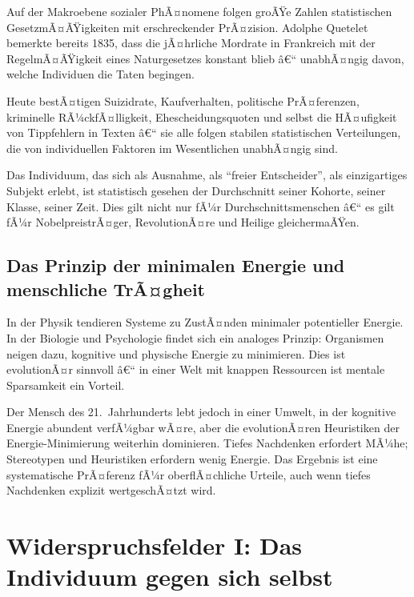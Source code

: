 ﻿\documentclass[12pt, a4paper]{article}
\begin{document}
Auf der Makroebene sozialer PhÃ¤nomene folgen groÃŸe Zahlen statistischen
GesetzmÃ¤ÃŸigkeiten mit erschreckender PrÃ¤zision. Adolphe Quetelet bemerkte bereits
1835, dass die jÃ¤hrliche Mordrate in Frankreich mit der RegelmÃ¤ÃŸigkeit eines
Naturgesetzes konstant blieb â€“ unabhÃ¤ngig davon, welche Individuen die Taten
begingen.

Heute bestÃ¤tigen Suizidrate, Kaufverhalten, politische PrÃ¤ferenzen, kriminelle
RÃ¼ckfÃ¤lligkeit, Ehescheidungsquoten und selbst die HÃ¤ufigkeit von Tippfehlern
in Texten â€“ sie alle folgen stabilen statistischen Verteilungen, die von
individuellen Faktoren im Wesentlichen unabhÃ¤ngig sind.

Das Individuum, das sich als Ausnahme, als \enquote{freier Entscheider}, als
einzigartiges Subjekt erlebt, ist statistisch gesehen der Durchschnitt seiner
Kohorte, seiner Klasse, seiner Zeit. Dies gilt nicht nur fÃ¼r Durchschnittsmenschen â€“
es gilt fÃ¼r NobelpreistrÃ¤ger, RevolutionÃ¤re und Heilige gleichermaÃŸen.

\subsection{Das Prinzip der minimalen Energie und menschliche TrÃ¤gheit}

In der Physik tendieren Systeme zu ZustÃ¤nden minimaler potentieller Energie.
In der Biologie und Psychologie findet sich ein analoges Prinzip: Organismen
neigen dazu, kognitive und physische Energie zu minimieren. Dies ist evolutionÃ¤r
sinnvoll â€“ in einer Welt mit knappen Ressourcen ist mentale Sparsamkeit ein Vorteil.

Der Mensch des 21.~Jahrhunderts lebt jedoch in einer Umwelt, in der kognitive
Energie abundent verfÃ¼gbar wÃ¤re, aber die evolutionÃ¤ren Heuristiken der
Energie-Minimierung weiterhin dominieren. Tiefes Nachdenken erfordert MÃ¼he;
Stereotypen und Heuristiken erfordern wenig Energie. Das Ergebnis ist eine
systematische PrÃ¤ferenz fÃ¼r oberflÃ¤chliche Urteile, auch wenn tiefes Nachdenken
explizit wertgeschÃ¤tzt wird.

\section{Widerspruchsfelder I: Das Individuum gegen sich selbst}
\end{document}
